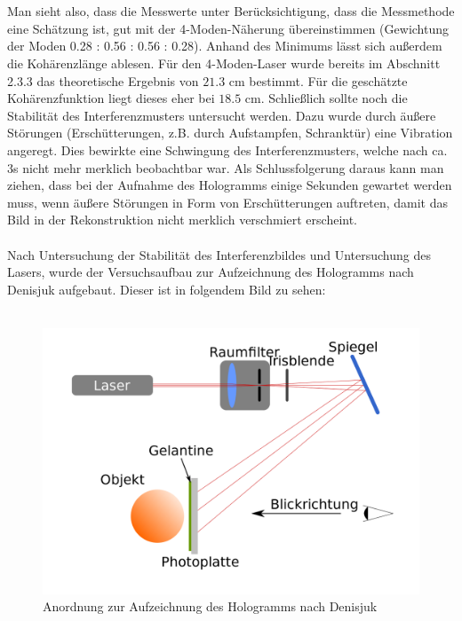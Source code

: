 \documentclass[german,  %
parskip=full,  %
]{scrartcl}
\begin{document}
\\\\
Man sieht also, dass die Messwerte unter Berücksichtigung, dass die Messmethode eine Schätzung ist, gut mit der 4-Moden-Näherung übereinstimmen (Gewichtung der Moden 0.28 : 0.56 : 0.56 : 0.28).  Anhand des Minimums lässt sich außerdem die Kohärenzlänge ablesen. Für den 4-Moden-Laser wurde bereits im Abschnitt 2.3.3 das theoretische Ergebnis von $21.3$ cm bestimmt. Für die geschätzte Kohärenzfunktion liegt dieses eher bei $18.5$ cm. Schließlich sollte noch die Stabilität des Interferenzmusters untersucht werden. Dazu wurde durch äußere Störungen (Erschütterungen, z.B. durch Aufstampfen, Schranktür) eine Vibration angeregt. Dies bewirkte eine Schwingung des Interferenzmusters, welche nach ca. $3$s nicht mehr merklich beobachtbar war. Als Schlussfolgerung daraus kann man ziehen, dass bei der Aufnahme des Hologramms einige Sekunden gewartet werden muss, wenn äußere Störungen in Form von Erschütterungen auftreten, damit das Bild in der Rekonstruktion nicht merklich verschmiert erscheint.
\\\\
Nach Untersuchung der Stabilität des Interferenzbildes und Untersuchung des Lasers, wurde der Versuchsaufbau zur Aufzeichnung des Hologramms nach Denisjuk aufgebaut. Dieser ist in folgendem Bild zu sehen:
\\\\
\begin{figure}[h!]\centering
\includegraphics[scale=0.4]{denisjuk.png}
\caption{Anordnung zur Aufzeichnung des Hologramms nach Denisjuk}
\end{figure}
\\\\
\end{document}

